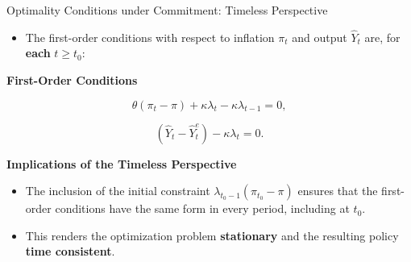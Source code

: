 \documentclass[11pt,aspectratio=169]{beamer}
\begin{document}
\begin{frame}{Optimality Conditions under Commitment: Timeless Perspective}
\small

\begin{itemize}
  \item The first-order conditions with respect to inflation $\pi_t$ and output $\hat{Y}_t$ are, for \textbf{each} $t \geq t_0$:
\end{itemize}
\textbf{First-Order Conditions}

\begin{equation*}
\theta (\pi _{t}-\pi )+\kappa \lambda _{t}-\kappa \lambda _{t-1}=0,
\end{equation*}

\begin{equation*}
(\hat{Y}_{t}-\hat{Y}_{t}^{e})-\kappa \lambda _{t}=0.
\end{equation*}

\vspace{0.4cm}

\textbf{Implications of the Timeless Perspective}
\begin{itemize}
  \item The inclusion of the initial constraint $\lambda_{t_0-1}(\pi_{t_0}-\pi)$ ensures that the first-order conditions have the same form in every period, including at $t_0$.
  \item This renders the optimization problem \textbf{stationary} and the resulting policy \textbf{time consistent}.
\end{itemize}

\end{frame}
\end{document}
